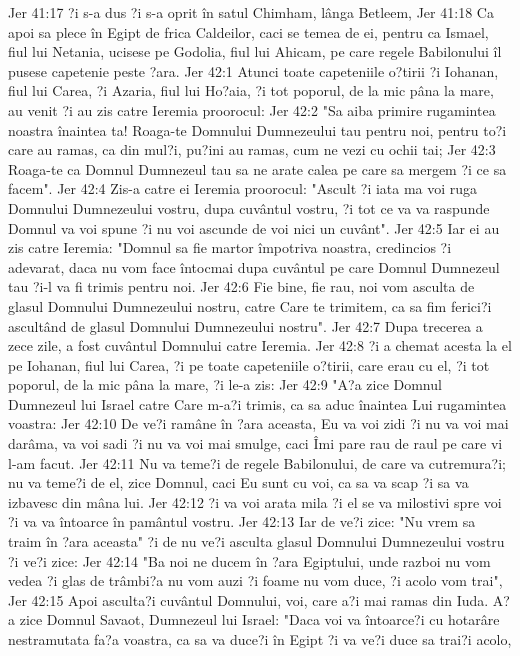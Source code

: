 Jer 41:17  ?i s-a dus ?i s-a oprit în satul Chimham, lânga Betleem,
Jer 41:18  Ca apoi sa plece în Egipt de frica Caldeilor, caci se temea de ei, pentru ca Ismael, fiul lui Netania, ucisese pe Godolia, fiul lui Ahicam, pe care regele Babilonului îl pusese capetenie peste ?ara.
Jer 42:1  Atunci toate capeteniile o?tirii ?i Iohanan, fiul lui Carea, ?i Azaria, fiul lui Ho?aia, ?i tot poporul, de la mic pâna la mare, au venit ?i au zis catre Ieremia proorocul:
Jer 42:2  "Sa aiba primire rugamintea noastra înaintea ta! Roaga-te Domnului Dumnezeului tau pentru noi, pentru to?i care au ramas, ca din mul?i, pu?ini au ramas, cum ne vezi cu ochii tai;
Jer 42:3  Roaga-te ca Domnul Dumnezeul tau sa ne arate calea pe care sa mergem ?i ce sa facem".
Jer 42:4  Zis-a catre ei Ieremia proorocul: "Ascult ?i iata ma voi ruga Domnului Dumnezeului vostru, dupa cuvântul vostru, ?i tot ce va va raspunde Domnul va voi spune ?i nu voi ascunde de voi nici un cuvânt".
Jer 42:5  Iar ei au zis catre Ieremia: "Domnul sa fie martor împotriva noastra, credincios ?i adevarat, daca nu vom face întocmai dupa cuvântul pe care Domnul Dumnezeul tau ?i-l va fi trimis pentru noi.
Jer 42:6  Fie bine, fie rau, noi vom asculta de glasul Domnului Dumnezeului nostru, catre Care te trimitem, ca sa fim ferici?i ascultând de glasul Domnului Dumnezeului nostru".
Jer 42:7  Dupa trecerea a zece zile, a fost cuvântul Domnului catre Ieremia.
Jer 42:8  ?i a chemat acesta la el pe Iohanan, fiul lui Carea, ?i pe toate capeteniile o?tirii, care erau cu el, ?i tot poporul, de la mic pâna la mare, ?i le-a zis:
Jer 42:9  "A?a zice Domnul Dumnezeul lui Israel catre Care m-a?i trimis, ca sa aduc înaintea Lui rugamintea voastra:
Jer 42:10  De ve?i ramâne în ?ara aceasta, Eu va voi zidi ?i nu va voi mai darâma, va voi sadi ?i nu va voi mai smulge, caci Îmi pare rau de raul pe care vi l-am facut.
Jer 42:11  Nu va teme?i de regele Babilonului, de care va cutremura?i; nu va teme?i de el, zice Domnul, caci Eu sunt cu voi, ca sa va scap ?i sa va izbavesc din mâna lui.
Jer 42:12  ?i va voi arata mila ?i el se va milostivi spre voi ?i va va întoarce în pamântul vostru.
Jer 42:13  Iar de ve?i zice: "Nu vrem sa traim în ?ara aceasta" ?i de nu ve?i asculta glasul Domnului Dumnezeului vostru ?i ve?i zice:
Jer 42:14  "Ba noi ne ducem în ?ara Egiptului, unde razboi nu vom vedea ?i glas de trâmbi?a nu vom auzi ?i foame nu vom duce, ?i acolo vom trai",
Jer 42:15  Apoi asculta?i cuvântul Domnului, voi, care a?i mai ramas din Iuda. A?a zice Domnul Savaot, Dumnezeul lui Israel: "Daca voi va întoarce?i cu hotarâre nestramutata fa?a voastra, ca sa va duce?i în Egipt ?i va ve?i duce sa trai?i acolo,
